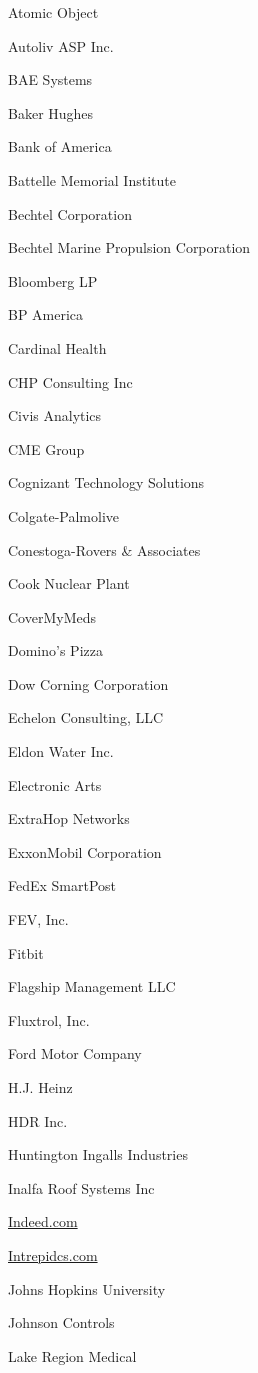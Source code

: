 \documentclass[twoside]{article}
\begin{document}
\begin{center}
\begin{multicols}{5}
\begin{FlushLeft}
\begin{compactitem}
\item Atomic Object
\item Autoliv ASP Inc.
\item BAE Systems
\item Baker Hughes
\item Bank of America
\item Battelle Memorial Institute
\item Bechtel Corporation
\item Bechtel Marine Propulsion Corporation
\item Bloomberg LP
\item BP America
\item Cardinal Health
\item CHP Consulting Inc
\item Civis Analytics
\item CME Group
\item Cognizant Technology Solutions
\item Colgate-Palmolive
\item Conestoga-Rovers \& Associates
\item Cook Nuclear Plant
\item CoverMyMeds
\item Domino's Pizza
\item Dow Corning Corporation
\item Echelon Consulting, LLC
\item Eldon Water Inc.
\item Electronic Arts
\item ExtraHop Networks
\item ExxonMobil Corporation
\item FedEx SmartPost
\item FEV, Inc.
\item Fitbit
\item Flagship Management LLC
\item Fluxtrol, Inc.
\item Ford Motor Company
\item H.J. Heinz
\item HDR Inc.
\item Huntington Ingalls Industries
\item Inalfa Roof Systems Inc
\item \url{Indeed.com}
\item \url{Intrepidcs.com}
\item Johns Hopkins University
\item Johnson Controls
\item Lake Region Medical

\end{compactitem}
\end{FlushLeft}
\end{multicols}
\end{center}
\end{document}
